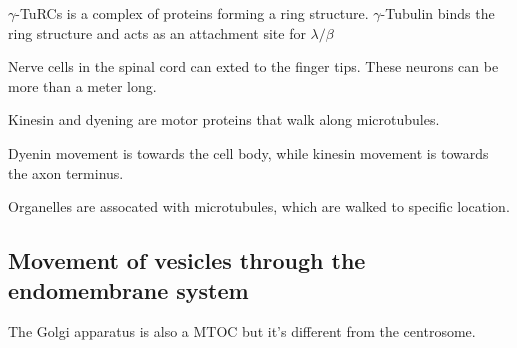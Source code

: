 \documentclass[11pt]{scrartcl}
\begin{document}
$\gamma$-TuRCs is a complex of proteins forming a ring
structure. $\gamma$-Tubulin binds the ring structure and acts as an
attachment site for $\lambda/\beta$

Nerve cells in the spinal cord can exted to the finger tips. These
neurons can be more than a meter long.

Kinesin and dyening are motor proteins that walk along microtubules.

Dyenin movement is towards the cell body, while kinesin movement is towards the axon terminus.

Organelles are assocated with microtubules, which are walked to specific location.

\subsection{Movement of vesicles through the endomembrane system}

The Golgi apparatus is also a MTOC but it's different from the centrosome.
\end{document}
